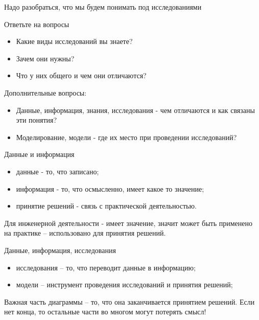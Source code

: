 \begin{frame}{Надо разобраться, что мы будем понимать под исследованиями}

Ответьте на вопросы
\begin{itemize}
    \item Какие виды исследований вы знаете?
    \item Зачем они нужны?
    \item Что у них общего и чем они отличаются?
\end{itemize}

Дополнительные вопросы:
\begin{itemize}
    \item Данные, информация, знания, исследования - чем отличаются и как связаны эти понятия?
    \item Моделирование, модели - где их место при проведении исследований? 
\end{itemize}

\end{frame}

\begin{frame}{Данные и информация}

\begin{center}
    
\end{center}

\begin{itemize}
    \item данные - то, что записано;
    \item информация - то, что осмысленно, имеет какое то значение;
    \item принятие решений - связь с практической деятельностью.
\end{itemize}

Для инженерной деятельности - имеет значение, значит может быть применено на практике -- использовано для принятия решений.

\end{frame}

\begin{frame}{Данные, информация, исследования}

\begin{center}
    
\end{center}

\begin{itemize}
    \item исследования -- то, что переводит данные в информацию;
    \item модели -- инструмент проведения исследований и принятия решений;
\end{itemize}

Важная часть диаграммы -- то, что она заканчивается принятием решений. Если нет конца, то остальные части во многом могут потерять смысл!

\end{frame}

